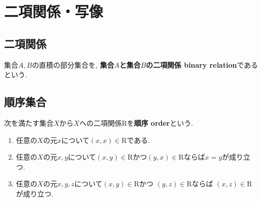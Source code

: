 \section{二項関係・写像}
\subsection{二項関係}
\begin{Def}
集合$A,B$の直積の部分集合を, {\bf 集合$A$と集合$B$の二項関係 binary relation}であるという.
\end{Def}
\begin{comment}
\begin{Def}
集合$A,B$の二項関係$\mathrm{R}$に関して, 
とある$a\in A, b\in B$の組$(a,b)$が$R$の元であるとき,
{\bf $a$と$b$に間に$\mathrm{R}$の関係\index{かんけい@関係}がある}という.
\end{Def}
\begin{Notation}
$a$と$b$の間に$\mathrm{R}$の関係があることを$aRb$と表す.
\end{Notation}
\end{comment}
\subsection{順序集合}
\begin{Def}
次を満たす集合$X$から$X$への二項関係$\mathrm{R}$を{\bf 順序 order}という.
\begin{enumerate}
\item 任意の$X$の元$x$について$(x,x)\in \mathrm{R}$である.
\item 任意の$X$の元$x,y$について$(x,y)\in \mathrm{R}$かつ$(y,x)\in \mathrm{R}$ならば$x=y$が成り立つ.
\item 任意の$X$の元$x,y,z$について$(x,y)\in \mathrm{R}$かつ $(y,z)\in \mathrm{R}$ならば
$(x,z)\in \mathrm{R}$が成り立つ.
\end{enumerate}
\end{Def}
\begin{comment}
\begin{Def}
順序をもつ集合を{\bf 順序集合 orderd set}という.
\end{Def}
\begin{Notation}
順序集合の元$x,y$に順序関係があるとき, $x\preceq y$で表す.
\end{Notation}
\end{comment}

